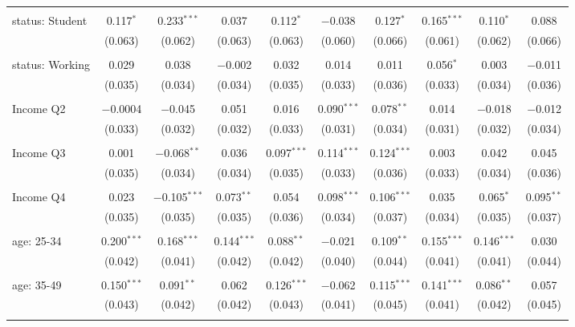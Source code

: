 \begin{tabular}{@{\extracolsep{5pt}}lccccccccc}
  & & & & & & & & & \\ 
 status: Student & 0.117$^{*}$ & 0.233$^{***}$ & 0.037 & 0.112$^{*}$ & $-$0.038 & 0.127$^{*}$ & 0.165$^{***}$ & 0.110$^{*}$ & 0.088 \\ 
  & (0.063) & (0.062) & (0.063) & (0.063) & (0.060) & (0.066) & (0.061) & (0.062) & (0.066) \\ 
  & & & & & & & & & \\ 
 status: Working & 0.029 & 0.038 & $-$0.002 & 0.032 & 0.014 & 0.011 & 0.056$^{*}$ & 0.003 & $-$0.011 \\ 
  & (0.035) & (0.034) & (0.034) & (0.035) & (0.033) & (0.036) & (0.033) & (0.034) & (0.036) \\ 
  & & & & & & & & & \\ 
 Income Q2 & $-$0.0004 & $-$0.045 & 0.051 & 0.016 & 0.090$^{***}$ & 0.078$^{**}$ & 0.014 & $-$0.018 & $-$0.012 \\ 
  & (0.033) & (0.032) & (0.032) & (0.033) & (0.031) & (0.034) & (0.031) & (0.032) & (0.034) \\ 
  & & & & & & & & & \\ 
 Income Q3 & 0.001 & $-$0.068$^{**}$ & 0.036 & 0.097$^{***}$ & 0.114$^{***}$ & 0.124$^{***}$ & 0.003 & 0.042 & 0.045 \\ 
  & (0.035) & (0.034) & (0.034) & (0.035) & (0.033) & (0.036) & (0.033) & (0.034) & (0.036) \\ 
  & & & & & & & & & \\ 
 Income Q4 & 0.023 & $-$0.105$^{***}$ & 0.073$^{**}$ & 0.054 & 0.098$^{***}$ & 0.106$^{***}$ & 0.035 & 0.065$^{*}$ & 0.095$^{**}$ \\ 
  & (0.035) & (0.035) & (0.035) & (0.036) & (0.034) & (0.037) & (0.034) & (0.035) & (0.037) \\ 
  & & & & & & & & & \\ 
 age: 25-34 & 0.200$^{***}$ & 0.168$^{***}$ & 0.144$^{***}$ & 0.088$^{**}$ & $-$0.021 & 0.109$^{**}$ & 0.155$^{***}$ & 0.146$^{***}$ & 0.030 \\ 
  & (0.042) & (0.041) & (0.042) & (0.042) & (0.040) & (0.044) & (0.041) & (0.041) & (0.044) \\ 
  & & & & & & & & & \\ 
 age: 35-49 & 0.150$^{***}$ & 0.091$^{**}$ & 0.062 & 0.126$^{***}$ & $-$0.062 & 0.115$^{***}$ & 0.141$^{***}$ & 0.086$^{**}$ & 0.057 \\ 
  & (0.043) & (0.042) & (0.042) & (0.043) & (0.041) & (0.045) & (0.041) & (0.042) & (0.045) \\ 
  & & & & & & & & & \\ 

\end{tabular}
